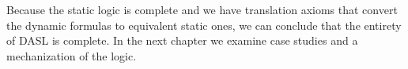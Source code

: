 Because the static logic is complete and we have translation axioms that convert the dynamic formulas to equivalent static ones, we can conclude that the entirety of DASL is complete. In the next chapter we examine case studies and a mechanization of the logic.
%



